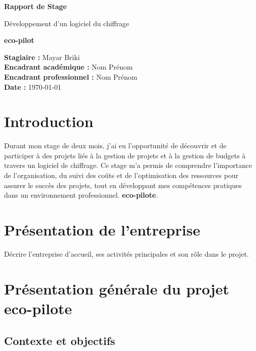 \documentclass[12pt,a4paper]{report}
\begin{document}
\begin{titlepage}
    \centering
    \vspace*{2cm}
    {\Huge \textbf{Rapport de Stage} \par}
    \vspace{1.5cm}
    {\LARGE Développement d’un logiciel du chiffrage\par}
    \vspace{0.5cm}
    {\Large \textbf{eco-pilot} \par}
    \vspace{2cm}
    \vfill
    \begin{flushright}
        \textbf{Stagiaire :} Mayar Briki \\
        \textbf{Encadrant académique :} Nom Prénom \\
        \textbf{Encadrant professionnel :} Nom Prénom \\
        \textbf{Date :} \today
    \end{flushright}
\end{titlepage}


\chapter{Introduction}
Durant mon stage de deux mois, j’ai eu l’opportunité de découvrir et de participer à des projets liés à la gestion de projets et à la gestion de budgets à travers un logiciel de chiffrage. Ce stage m’a permis de comprendre l’importance de l’organisation, du suivi des coûts et de l’optimisation des ressources pour assurer le succès des projets, tout en développant mes compétences pratiques dans un environnement professionnel. \textbf{eco-pilote}.  

\chapter{Présentation de l’entreprise}
Décrire l’entreprise d’accueil, ses activités principales et son rôle dans le projet.  

\chapter{Présentation générale du projet eco-pilote}
\section{Contexte et objectifs}
\end{document}
